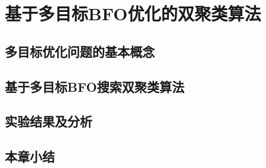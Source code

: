 \chapter{基于多目标BFO优化的双聚类算法}

\section{多目标优化问题的基本概念}


\section{基于多目标BFO搜索双聚类算法}

\section{实验结果及分析}

\section{本章小结}